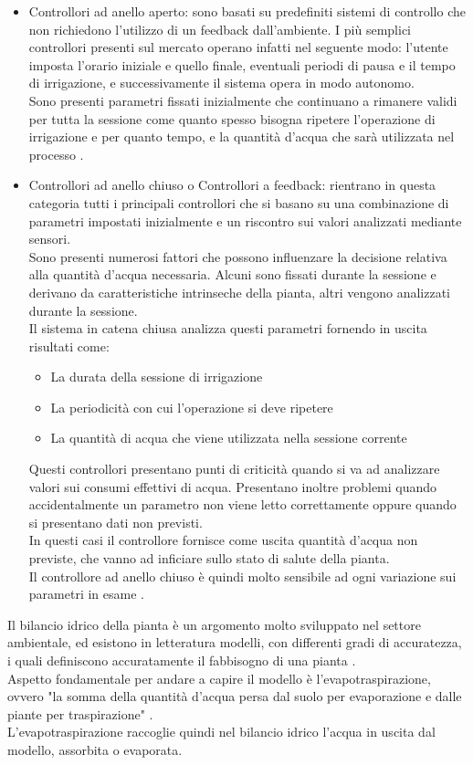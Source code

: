 \documentclass[conference,10pt]{IEEEtran}
\begin{document}
\begin{itemize}
	\item Controllori ad anello aperto: sono basati su predefiniti sistemi di controllo che non richiedono l'utilizzo di un feedback dall'ambiente. I più semplici controllori presenti sul mercato operano infatti nel seguente modo: l'utente imposta l'orario iniziale e quello finale, eventuali periodi di pausa e il tempo di irrigazione, e successivamente il sistema opera in modo autonomo.\\ 
	Sono presenti parametri fissati inizialmente che continuano a rimanere validi per tutta la sessione come quanto spesso bisogna ripetere l'operazione di irrigazione e per quanto tempo, e la quantità d'acqua che sarà utilizzata nel processo \cite{1}.\\
	\item Controllori ad anello chiuso o Controllori a feedback: rientrano in questa categoria tutti i principali controllori che si basano su una combinazione di parametri impostati inizialmente e un riscontro sui valori analizzati mediante sensori. \\
	Sono presenti numerosi fattori che possono influenzare la decisione relativa alla quantità d'acqua necessaria. Alcuni sono fissati durante la sessione e derivano da caratteristiche intrinseche della pianta, altri vengono analizzati durante la sessione.\\
	Il sistema in catena chiusa analizza questi parametri fornendo in uscita risultati come:
	\begin{itemize}
		\item La durata della sessione di irrigazione
		\item La periodicità con cui l'operazione si deve ripetere
		\item La quantità di acqua che viene utilizzata nella sessione corrente
	\end{itemize}
	Questi controllori presentano punti di criticità quando si va ad analizzare valori sui consumi effettivi di acqua. Presentano inoltre problemi quando accidentalmente un parametro non viene letto correttamente oppure quando si presentano dati non previsti.\\
	In questi casi il controllore fornisce come uscita quantità d'acqua non previste, che vanno ad inficiare sullo stato di salute della pianta.\\ Il controllore ad anello chiuso è quindi molto sensibile ad ogni variazione sui parametri in esame \cite{1}.
	\newline
\end{itemize}
Il bilancio idrico della pianta è un argomento molto sviluppato nel settore ambientale, ed esistono in letteratura modelli, con differenti gradi di accuratezza, i quali definiscono accuratamente il fabbisogno di una pianta \cite{11}.\\
Aspetto fondamentale per andare a capire il modello è l'evapotraspirazione, ovvero "la somma della quantità d’acqua persa dal suolo per evaporazione e dalle piante per traspirazione" \cite{6}. \\
L'evapotraspirazione raccoglie quindi nel bilancio idrico l'acqua in uscita dal modello, assorbita o evaporata.
\end{document}
